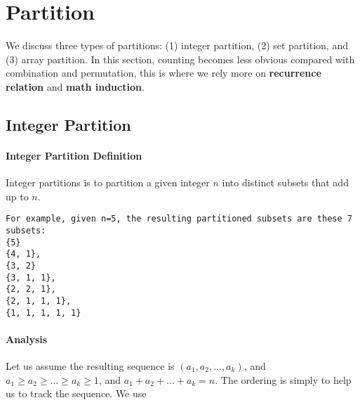 \documentclass[../main.tex]{subfiles}
\begin{document}
\section{Partition}
We discuss three types of partitions: (1) integer partition, (2) set partition, and (3) array partition. In this section, counting becomes less obvious compared with combination and permutation, this is where we rely more on \textbf{recurrence relation} and \textbf{math induction}. 


\subsection{Integer Partition}
\paragraph{Integer Partition Definition} Integer partitions is to partition a given integer $n$ into distinct subsets that add up to $n$. 
\begin{lstlisting}[numbers=none]
For example, given n=5, the resulting partitioned subsets are these 7 subsets: 
{5}
{4, 1},
{3, 2}
{3, 1, 1},
{2, 2, 1},  
{2, 1, 1, 1}, 
{1, 1, 1, 1, 1}
\end{lstlisting}

\paragraph{Analysis} Let us assume the resulting sequence is $(a_1, a_2, ..., a_k)$, and $ a_1\geq a_2\geq...\geq a_k\geq 1$, and  $a_1+ a_2+ ... + a_k= n$. The ordering is simply to help us to track the sequence.  We use 
\end{document}
